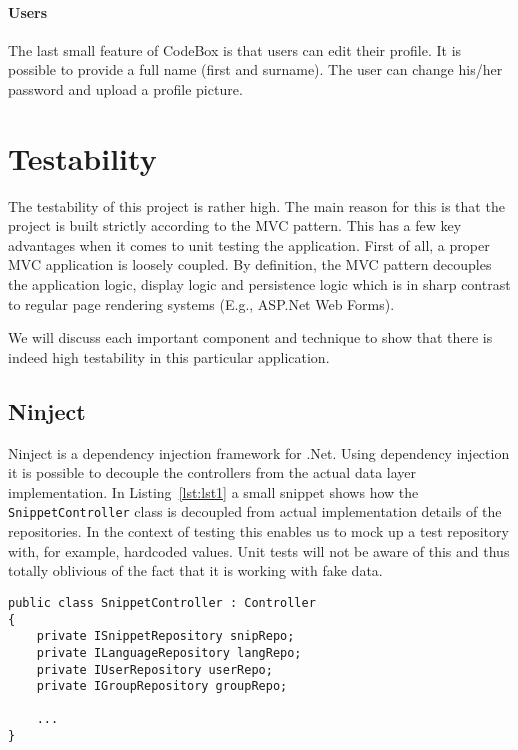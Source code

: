 \documentclass[10pt,a4paper,BCOR12mm, headexclude, footexclude,
  twoside, openright]{scrartcl}
\numberwithin{equation}{section} %
\numberwithin{figure}{section} %
\numberwithin{table}{section} %
\begin{document}
\paragraph{Users}
The last small feature of CodeBox is that users can edit their profile. It is
possible to provide a full name (first and surname). The user can change his/her
password and upload a profile picture.

\section{Testability}
The testability of this project is rather high. The main reason for this is that
the project is built strictly according to the MVC pattern. This has a few key
advantages when it comes to unit testing the application. First of all, a proper
MVC application is loosely coupled. By definition, the MVC pattern decouples the
application logic, display logic and persistence logic which is in sharp
contrast to regular page rendering systems (E.g., ASP.Net Web Forms).

We will discuss each important component and technique to show that there is
indeed high testability in this particular application.

\subsection{Ninject}
Ninject is a dependency injection framework for .Net. Using dependency injection
it is possible to decouple the controllers from the actual data layer
implementation. In Listing~\ref{lst:lst1} a small snippet shows how the
\texttt{SnippetController} class is decoupled from actual implementation details
of the repositories. In the context of testing this enables us to mock up a test
repository with, for example, hardcoded values. Unit tests will not be aware of
this and thus totally oblivious of the fact that it is working with fake data.


\begin{lstlisting}[caption={Example of decoupling controller from data layer}, label={lst:lst1}]
public class SnippetController : Controller
{
    private ISnippetRepository snipRepo;
    private ILanguageRepository langRepo;
    private IUserRepository userRepo;
    private IGroupRepository groupRepo;

    ...
}
\end{lstlisting}
\end{document}

